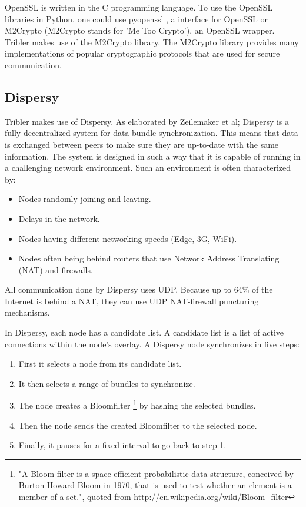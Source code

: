 		OpenSSL is written in the C programming language. To use the OpenSSL libraries in Python, one could use pyopenssl \cite{pyopensslgithub}, a interface for OpenSSL or M2Crypto \cite{m2cryptogithub} (M2Crypto stands for 'Me Too Crypto'), an OpenSSL wrapper. Tribler makes use of the M2Crypto library. The M2Crypto library provides many implementations of popular cryptographic protocols that are used for secure communication.
		
	\subsection{Dispersy}
	\label{sec:dispersy}
		Tribler makes use of Dispersy. As elaborated by Zeilemaker et al; Dispersy \cite{zeilemaker2013dispersy} is a fully decentralized system for data bundle synchronization. This means that data is exchanged between peers to make sure they are up-to-date with the same information. The system is designed in such a way that it is capable of running in a challenging network environment. Such an environment is often characterized by:
		\begin{itemize}
			\item Nodes randomly joining and leaving.
			\item Delays in the network.
			\item Nodes having different networking speeds (Edge, 3G, WiFi).
			\item Nodes often being behind routers that use Network Address Translating (NAT) and firewalls.
		\end{itemize}
		
		All communication done by Dispersy uses UDP. Because up to 64\% of the Internet is behind a NAT, they can use UDP NAT-firewall puncturing mechanisms\cite{zeilemaker2013dispersy}.
		
		In Dispersy, each node has a candidate list. A candidate list is a list of active connections within the node's overlay. A Dispersy node synchronizes in five steps:
		
		\begin{enumerate}
			\item First it selects a node from its candidate list.
			\item It then selects a range of bundles to synchronize.
			\item The node creates a Bloomfilter \footnote{"A Bloom filter is a space-efficient probabilistic data structure, conceived by Burton Howard Bloom in 1970, that is used to test whether an element is a member of a set.", quoted from http://en.wikipedia.org/wiki/Bloom\_filter} by hashing the selected bundles.
			\item Then the node sends the created Bloomfilter to the selected node.
			\item Finally, it pauses for a fixed interval to go back to step 1.
		\end{enumerate}
		
